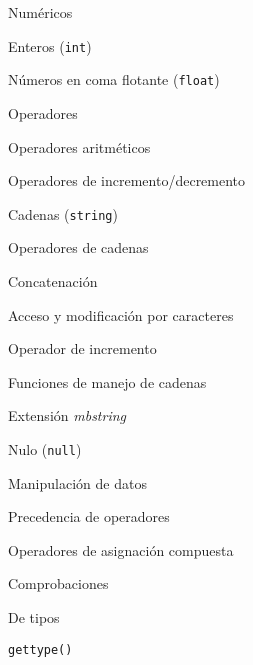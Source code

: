 \begin{longenum}
\begin{longenum}
\begin{longenum}
\begin{longenum}
            \end{longenum}
            \item Numéricos
            \begin{longenum}
                \item Enteros (\texttt{int})
                \item Números en coma flotante (\texttt{float})
                \item Operadores
                \begin{longenum}
                    \item Operadores aritméticos
                    \item Operadores de incremento/decremento
                \end{longenum}
            \end{longenum}
            \item Cadenas (\texttt{string})
            \begin{longenum}
                \item Operadores de cadenas
                \begin{longenum}
                    \item Concatenación
                    \item Acceso y modificación por caracteres
                    \item Operador de incremento \opcional\
                \end{longenum}
                \item Funciones de manejo de cadenas
                \item Extensión \textit{mbstring}
            \end{longenum}
            \item Nulo (\texttt{null})
        \end{longenum}
        \item Manipulación de datos
        \begin{longenum}
            \item Precedencia de operadores
            \item Operadores de asignación compuesta
            \item Comprobaciones
            \begin{longenum}
                \item De tipos
                \begin{longenum}
                    \item \texttt{gettype()}

\end{longenum}
\end{longenum}
\end{longenum}
\end{longenum}
\end{longenum}
